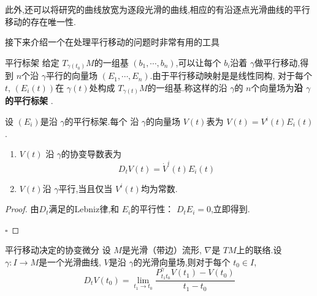 \documentclass[../../几何与拓扑.tex]{subfiles}
\begin{document}
此外,还可以将研究的曲线放宽为逐段光滑的曲线,相应的有沿逐点光滑曲线的平行移动的存在唯一性.

接下来介绍一个在处理平行移动的问题时非常有用的工具 
\begin{definition}{平行标架}
    给定 \(  T_{ \gamma \left( t_0 \right) }M  \)的一组基 \(  \left(  b_1,\cdots,b_n  \right)   \),可以让每个 \(  b_{i}  \)沿着 \(   \gamma   \)做平行移动,得到 \(  n  \)个沿 \(   \gamma   \)平行的向量场 \(  \left(  E_1,\cdots,E_n  \right)   \).由于平行移动映射是是线性同构, 对于每个 \(  t  \), \(  \left( E_{i}\left( t \right)  \right)   \)在 \(   \gamma \left( t \right)   \)处构成 \(  T_{ \gamma \left( t \right) }M  \)的一组基.称这样的沿 \(   \gamma   \)的 \(  n  \)个向量场为\textbf{沿 \(   \gamma   \)的平行标架 }.             
\end{definition}

\begin{proposition}
    设 \(  \left( E_{i} \right)   \)是沿 \(   \gamma   \)的平行标架.每个 沿 \(   \gamma   \)的向量场 \(  V\left( t \right)   \)表为 \(  V\left( t \right)= V^{i}\left( t \right)E_{i}\left( t \right)     \).
    \begin{enumerate}
        \item \(  V\left( t \right)   \) 沿 \(   \gamma   \)的协变导数表为 \[
            D_{t}V\left( t \right)= \dot{V}^{i}\left( t \right)E_{i}\left( t \right)   
            \]      
        \item \(  V\left( t \right)   \)沿 \(   \gamma   \)平行,当且仅当 \(  V^{i}\left( t \right)   \)均为常数.   
    \end{enumerate}
    
\end{proposition}


\begin{proof}
    由\(  D_{t}  \)满足的Lebniz律,和 \(  E_{i}  \)的平行性： \(  D_{t}E_{i}= 0  \),立即得到.   

    \hfill $\square$
\end{proof}


\begin{theorem}{平行移动决定的协变微分}
    设 \(  M  \)是光滑（带边）流形,  \(   \nabla   \)是 \(  TM  \)上的联络.设 \(   \gamma :I\to M  \)是一个光滑曲线, \(  V  \)是沿 \(   \gamma   \)的光滑向量场,则对于每个 \(  t_0 \in I  \), \[
    D_{t}V\left( t_0 \right) =  \lim_{t_1\to t_0} \frac{P_{t_1t_0}^{ \gamma }V\left( t_1 \right)-V\left( t_0 \right)   }{t_1-t_0 } 
    \]       
\end{theorem}
\end{document}
